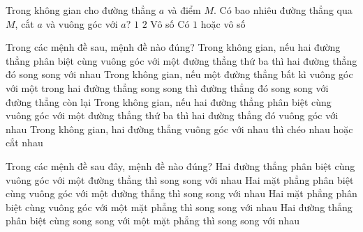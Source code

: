 \begin{ex}%
	Trong không gian cho đường thẳng $a$ và điểm $ M $. Có bao nhiêu đường thẳng qua $ M $, cắt $a$ và vuông góc với $a $?
	\choice
	{$1$}
	{$2$}
	{Vô số}
	{\True Có $1$ hoặc vô số}
\end{ex}

\begin{ex}%
	Trong các mệnh đề sau, mệnh đề nào đúng?
	\choice
	{Trong không gian, nếu hai đường thẳng phân biệt cùng vuông góc với một đường thẳng thứ ba thì hai đường thẳng đó song song với nhau}
	{Trong không gian, nếu một đường thẳng bất kì vuông góc với một trong hai đường thẳng song song thì đường thẳng đó song song với đường thẳng còn lại}
	{Trong không gian, nếu hai đường thẳng phân biệt cùng vuông góc với một đường thẳng thứ ba thì hai đường thẳng đó vuông góc với nhau}
	{\True Trong không gian, hai đường thẳng vuông góc với nhau thì chéo nhau hoặc cắt nhau}
\end{ex}

	\begin{ex}%
		Trong các mệnh đề sau đây, mệnh đề nào đúng?
		\choice 
		{ Hai đường thẳng phân biệt cùng vuông góc với một đường thẳng thì song song với nhau} 
		{ \True Hai mặt phẳng phân biệt cùng vuông góc với một đường thẳng thì song song với nhau} 
		{ Hai mặt phẳng phân biệt cùng vuông góc với một mặt phẳng thì song song với nhau} 
		{ Hai đường thẳng phân biệt cùng song song với một mặt phẳng thì song song với nhau}
	\end{ex}
	
